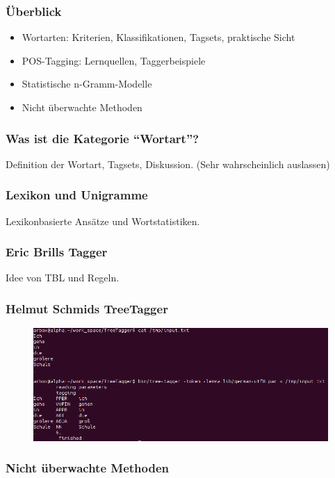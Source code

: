 \begin{frame}
  \frametitle{Überblick}
  \begin{itemize}
  \item Wortarten: Kriterien, Klassifikationen, Tagsets, praktische Sicht
  \item POS-Tagging: Lernquellen, Taggerbeispiele
  \item Statistische n-Gramm-Modelle
  \item Nicht überwachte Methoden
  \end{itemize}
\end{frame}

\begin{frame}
  \frametitle{Was ist die Kategorie "`Wortart"'?}
  Definition der Wortart, Tagsets, Diskussion.
  (Sehr wahrscheinlich auslassen)
\end{frame}

\begin{frame}
  \frametitle{Lexikon und Unigramme}
  Lexikonbasierte Ansätze und Wortstatistiken.
\end{frame}

\begin{frame}
  \frametitle{Eric Brills Tagger}
  Idee von TBL und Regeln.

\end{frame}

\begin{frame}
  \frametitle{Helmut Schmids TreeTagger}
  \begin{figure}
    \centering
    \includegraphics[width = \textwidth]{tree_tagger}
  \end{figure}
\end{frame}

\begin{frame}
  \frametitle{Nicht überwachte Methoden}

\end{frame}

\begin{frame}[allowframebreaks]
  \nocite{*}
  \printbibliography
\end{frame}



